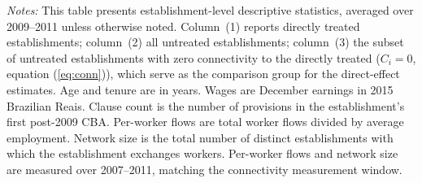 \documentclass[11pt]{article}
\begin{document}
\begin{table}[H]
\begin{minipage}{\linewidth}
    \textit{Notes:} This table presents establishment-level descriptive statistics, averaged over 2009--2011 unless otherwise noted. Column~(1) reports directly treated establishments; column~(2) all untreated establishments; column~(3) the subset of untreated establishments with zero connectivity to the directly treated ($C_i = 0$, equation (\ref{eq:conn})), which serve as the comparison group for the direct-effect estimates. Age and tenure are in years. Wages are December earnings in 2015 Brazilian Reais. Clause count is the number of provisions in the establishment's first post-2009 CBA. Per-worker flows are total worker flows divided by average employment. Network size is the total number of distinct establishments with which the establishment exchanges workers. Per-worker flows and network size are measured over 2007--2011, matching the connectivity measurement window.
\end{minipage}
\end{table}
\end{document}
